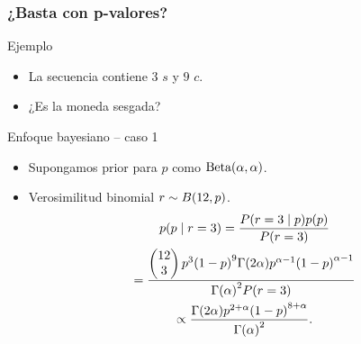 \documentclass[table]{beamer}
\begin{document}
\begin{frame}
    \frametitle{¿Basta con p-valores?}
    \begin{exampleblock}{Ejemplo}
        \begin{itemize}
            \item La secuencia contiene $3$ $s$ y $9$ $c$.
            \item ¿Es la moneda sesgada?
        \end{itemize}
    \end{exampleblock}
    \begin{block}{Enfoque bayesiano -- caso 1}
        \begin{itemize}
            \item Supongamos prior para $p$ como $\betadist{\alpha}{\alpha}$.
            \item Verosimilitud binomial $r \sim \binomial{12}{p}$.
                \begin{multline*}
                    \pdf{p \mid r = 3} = \frac{\prob{r = 3 \mid p} \pdf{p}}{\prob{r = 3}}
                    \\
                    = \frac{\combin{12}{3} p^{3} \parens{1 - p}^{9} \gammafunc{2 \alpha} p^{\alpha - 1} \parens{1 - p}^{\alpha - 1}}{\gammafunc{\alpha}^{2} \prob{r = 3}}
                    \\
                    \propto \frac{\gammafunc{2 \alpha} p^{2 + \alpha} \parens{1 - p}^{8 + \alpha}}{\gammafunc{\alpha}^{2}} .
                \end{multline*}
        \end{itemize}
    \end{block}
\end{frame}
\end{document}
